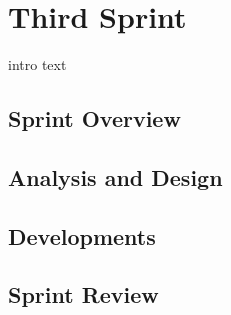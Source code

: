 \chapter{Third Sprint}\label{chap:sprint3}
intro text
\section{Sprint Overview}


\section{Analysis and Design}


\section{Developments}


\section{Sprint Review}

